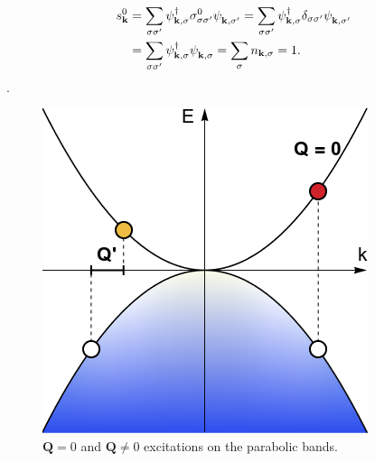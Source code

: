 \documentclass[english,aps,prd,nofootinbib,twocolumn]{revtex4-1}
\begin{document}
\begin{equation}
\begin{split}
s^{0}_{\mathbf{k }} &= \sum_{\sigma \sigma'} 
\psi_{\mathbf{k ,\sigma }}^{\textcolor{black}{\dagger}}
\sigma^{0}_{\sigma \sigma'}
\psi_{\mathbf{k ,\sigma'}}^{\textcolor{white}{\dagger}} =
\sum_{\sigma \sigma'} 
\psi_{\mathbf{k ,\sigma }}^{\textcolor{black}{\dagger}}
\delta_{\sigma \sigma'}
\psi_{\mathbf{k ,\sigma'}}^{\textcolor{white}{\dagger}} \\ &=
\sum_{\sigma \sigma'} 
\psi_{\mathbf{k ,\sigma }}^{\textcolor{black}{\dagger}}
\psi_{\mathbf{k ,\sigma }}^{\textcolor{white}{\dagger}} =
\sum_{\sigma } 
n_{\mathbf{k ,\sigma }} = 
1.
\end{split}
\end{equation}.

\begin{figure}
\centering
\includegraphics[scale=0.45]{ParabolicVertical.png}
\caption{$\mathbf{Q}=0$ and $\mathbf{Q}\neq 0$ excitations on the parabolic bands.}
\label{fig:Q=0-excitons}
\end{figure}
\end{document}
